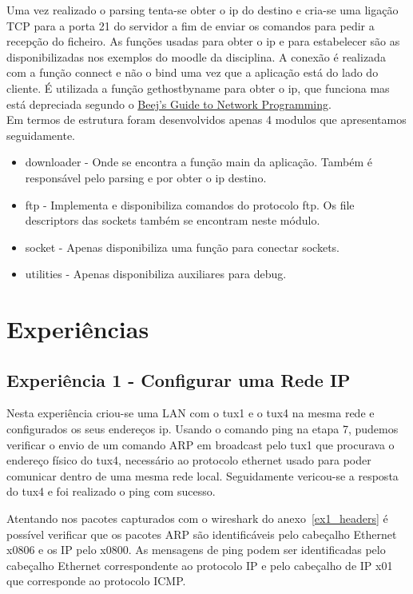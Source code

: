 \documentclass[11pt,a4paper,reqno]{report}
\numberwithin{equation}{section}
\begin{document}
Uma vez realizado o parsing tenta-se obter o ip do destino e cria-se uma ligação TCP para a porta 21 do servidor a fim de enviar os comandos para pedir a recepção do ficheiro. As funções usadas para obter o ip e para estabelecer são as disponibilizadas nos exemplos do moodle da disciplina. A conexão é realizada com a função connect e não o bind uma vez que a aplicação está do lado do cliente. É utilizada a função gethostbyname para obter o ip, que funciona mas está depreciada segundo o \href{ http://beej.us/guide/bgnet/output/html/multipage/index.html}{Beej's Guide to Network Programming}.\\

Em termos de estrutura foram desenvolvidos apenas 4 modulos que apresentamos seguidamente.
\begin{itemize} 
\item downloader - Onde se encontra a função main da aplicação. Também é responsável pelo parsing e por obter o ip destino.
\item ftp -  Implementa e disponibiliza comandos do protocolo ftp. Os file descriptors das sockets também se encontram neste módulo.
\item socket - Apenas disponibiliza uma função para conectar sockets.
\item utilities - Apenas disponibiliza auxiliares para debug.
\end{itemize}

\chapter{Experiências}

\section{Experiência 1 - Configurar uma Rede IP}

Nesta experiência criou-se uma LAN com o tux1 e o tux4 na mesma rede e configurados os seus endereços ip. Usando o comando ping na etapa 7, pudemos verificar o envio de um comando ARP em broadcast pelo tux1 que procurava o endereço físico do tux4, necessário ao protocolo ethernet usado para poder comunicar dentro de uma mesma rede local. Seguidamente vericou-se a resposta do tux4 e foi realizado o ping com sucesso.

Atentando nos pacotes capturados com o wireshark do anexo~\ref{ex1_headers} é possível verificar que os pacotes ARP são identificáveis pelo cabeçalho Ethernet x0806 e os IP pelo x0800. As mensagens de ping podem ser identificadas pelo cabeçalho Ethernet correspondente ao protocolo IP e pelo cabeçalho de IP x01 que corresponde ao protocolo ICMP.
\end{document}
